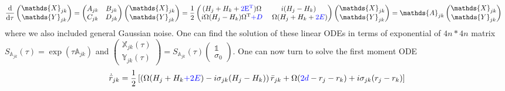 \documentclass[%
reprint,
superscriptaddress,
nofootinbib,
 amsmath,amssymb,
prx,
floatfix,
]{revtex4-2}
\begin{document}
\begin{align}
    \frac{\text{d}}{\text{d} \tau}\begin{pmatrix}
        \mathds{X}_{jk} \\
        \mathds{Y}_{jk}
    \end{pmatrix} &= \begin{pmatrix}
         A_{jk} & B_{jk}\\
        C_{jk} & D_{jk}
    \end{pmatrix}
    \begin{pmatrix}
        \mathds{X}_{jk} \\
        \mathds{Y}_{jk}
    \end{pmatrix} =  \frac{1}{2} \begin{pmatrix}
          ( H_j + H_k   + \textcolor{blue}{2 {\rm E}^{\rm T}} ) \Omega  &  i ( H_j - H_k) \\
          i \Omega ( H_j - H_k)  \Omega^{\rm T }  \textcolor{blue}{+ D} & \ \Omega  ( H_j + H_k   + \textcolor{blue}{2 E} )
    \end{pmatrix} \begin{pmatrix}
        \mathds{X}_{jk} \\
        \mathds{Y}_{jk}
    \end{pmatrix} = \mathds{A}_{jk}
    \begin{pmatrix}
        \mathds{X}_{jk} \\
        \mathds{Y}_{jk}
    \end{pmatrix} \nonumber
\end{align}
where we also included general Gaussian noise. One can find the solution of these linear ODEs in terms of exponential of $4n*4n$ matrix $S_{\mathds{A}_{jk}}(\tau) = \exp(\tau \mathds{A}_{jk})$ and  $\begin{pmatrix}
    \mathds{X}_{jk} (\tau)\\
    \mathds{Y}_{jk}(\tau)
\end{pmatrix}  = S_{\mathds{A}_{jk}}(\tau) \begin{pmatrix}
    \mathds{1} \\
    \sigma_0
\end{pmatrix} $. 
One can now turn to solve the first moment ODE
\begin{equation}
    \dot{\bar{r}}_{jk} =\frac{1}{2}\left[ \left(  \Omega ( H_j + H_k \textcolor{blue}{+2 E} )  - i   \sigma_{jk} (H_j - H_k) \right)  \bar{r}_{jk} 
     + \Omega (\textcolor{blue}{2d} - r_j - r_k) + i  \sigma_{jk} ( r_j - r_k) \right] 
\end{equation}
\end{document}
